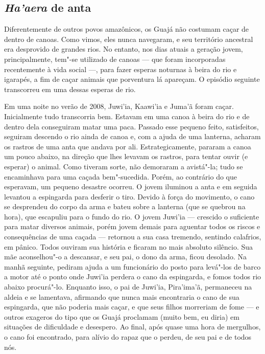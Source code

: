 \subsection{\emph{Ha'aera} de anta}

\forceindent
Diferentemente de outros povos amazônicos, os Guajá não costumam caçar
de dentro de canoas. Como vimos, eles nunca navegaram, e seu território
ancestral era desprovido de grandes rios. No entanto, nos dias atuais a
geração jovem, principalmente, tem"-se utilizado de canoas --- que foram
incorporadas recentemente à vida social ---, para fazer esperas noturnas à
beira do rio e igarapés, a fim de caçar animais que porventura lá
apareçam. O episódio seguinte transcorreu em uma dessas esperas de rio.

Em uma noite no verão de 2008, Juwi'ia, Kaawi'ia e Juma'ã foram caçar.
Inicialmente tudo transcorria bem. Estavam em uma canoa à beira do rio e
de dentro dela conseguiram matar uma paca. Passado esse pequeno feito,
satisfeitos, seguiram descendo o rio ainda de canoa e, com a ajuda de
uma lanterna, acharam os rastros de uma anta que andava por ali.
Estrategicamente, pararam a canoa um pouco abaixo, na direção que lhes
levavam os rastros, para tentar ouvir (e esperar) o animal. Como tiveram
sorte, não demoraram a avistá"-la; tudo se encaminhava para uma caçada
bem"-sucedida. Porém, ao contrário do que esperavam, um pequeno desastre
ocorreu. O jovem iluminou a anta e em seguida levantou a espingarda para
desferir o tiro. Devido à força do movimento, o cano se desprendeu do
corpo da arma e bateu sobre a lanterna (que se quebrou na hora), que
escapuliu para o fundo do rio. O jovem Juwi'ia --- crescido o suficiente
para matar diversos animais, porém jovem demais para aguentar todos os
riscos e consequências de uma caçada --- retornou a sua casa tremendo,
sentindo calafrios, em pânico. Todos ouviram sua história e ficaram no
mais absoluto silêncio. Sua mãe aconselhou"-o a descansar, e seu pai, o
dono da arma, ficou desolado. Na manhã seguinte, pediram ajuda a um
funcionário do posto para levá"-los de barco a motor até o ponto onde
Juwi'ia perdera o cano da espingarda, e fomos todos rio abaixo
procurá"-lo. Enquanto isso, o pai de Juwi'ia, Pira'ima'ã, permaneceu na
aldeia e se lamentava, afirmando que nunca mais encontraria o cano de
sua espingarda, que não poderia mais caçar, e que seus filhos morreriam
de fome --- e outros exageros do tipo que os Guajá proclamam (muito bem,
eu diria) em situações de dificuldade e desespero. Ao final, após quase
uma hora de mergulhos, o cano foi encontrado, para alívio do rapaz que o
perdeu, de seu pai e de todos nós.

